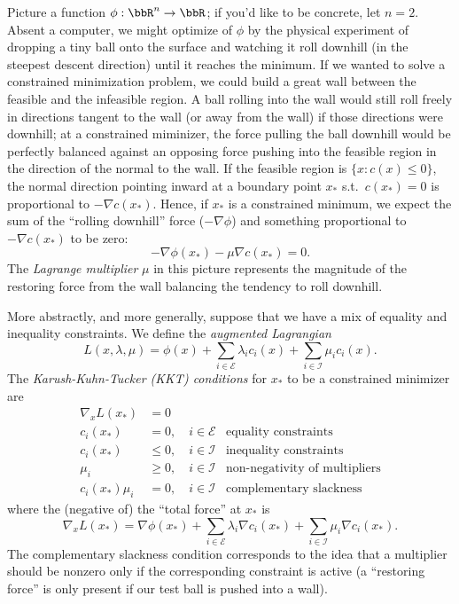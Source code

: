 \documentclass[12pt, leqno]{article} %
\begin{document}
Picture a function $\phi : \bbR^n \rightarrow \bbR$; if you'd like to
be concrete, let $n = 2$.  Absent a computer, we might optimize of
$\phi$ by the physical experiment of dropping a tiny ball onto the
surface and watching it roll downhill (in the steepest descent
direction) until it reaches the minimum.  If we wanted to solve a
constrained minimization problem, we could build a great wall between
the feasible and the infeasible region.  A ball rolling into the wall
would still roll freely in directions tangent to the wall (or away
from the wall) if those directions were downhill; at a constrained
miminizer, the force pulling the ball downhill would be perfectly
balanced against an opposing force pushing into the feasible region
in the direction of the normal to the wall.  If the feasible region
is $\{x : c(x) \leq 0\}$, the normal direction pointing inward at a
boundary point $x_*$ s.t.~$c(x_*) = 0$ is proportional to
$-\nabla c(x_*)$.  Hence, if $x_*$ is a constrained minimum,
we expect the sum of the ``rolling downhill'' force ($-\nabla \phi$)
and something proportional to $-\nabla c(x_*)$ to be zero:
\[
  -\nabla \phi(x_*) - \mu \nabla c(x_*) = 0.
\]
The {\em Lagrange multiplier} $\mu$ in this picture represents the
magnitude of the restoring force from the wall balancing the tendency
to roll downhill.

More abstractly, and more generally, suppose that we have a mix of
equality and inequality constraints.  We define
the {\em augmented Lagrangian}
\[
  L(x, \lambda, \mu) = \phi(x) +
    \sum_{i \in \mathcal{E}} \lambda_i c_i(x) +
    \sum_{i \in \mathcal{I}} \mu_i c_i(x).
\]
The {\em Karush-Kuhn-Tucker (KKT) conditions} for $x_*$ to be a
constrained minimizer are
\begin{align*}
  \nabla_x L(x_*) &= 0 \\
  c_i(x_*) &= 0, \quad i \in \mathcal{E}
  & \mbox{equality constraints}\\
  c_i(x_*) & \leq 0, \quad i \in \mathcal{I}
  & \mbox{inequality constraints}\\
  \mu_i & \geq 0, \quad i \in \mathcal{I}
  & \mbox{non-negativity of multipliers}\\
  c_i(x_*) \mu_i &= 0, \quad i \in \mathcal{I}
  & \mbox{complementary slackness}
\end{align*}
where the (negative of) the ``total force'' at $x_*$ is
\[
  \nabla_x L(x_*) = \nabla \phi(x_*) +
    \sum_{i\in \mathcal{E}} \lambda_i \nabla c_i(x_*) +
    \sum_{i\in \mathcal{I}} \mu_i \nabla c_i(x_*).
\]
The complementary slackness condition corresponds to the idea that a
multiplier should be nonzero only if the corresponding constraint is
active (a ``restoring force'' is only present if our test ball
is pushed into a wall).
\end{document}
